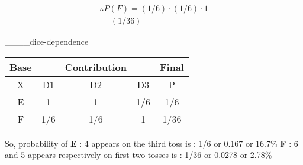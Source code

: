 \documentclass[journal,12pt,onecolumn]{IEEEtran}
\theoremstyle{remark}
\begin{document}
\begin{multicols}{2}
\begin{align}
\therefore     	P(F) = (1/6) \cdot (1/6) \cdot 1 \\= (1/36)
\end{align}
%
\begin{center}
\_\_\_\_dice-dependence
\newline
\begin{tabular}
{|c | c c c | c |}\hline
Base & &Contribution && Final\\\hline\hline
X & D1 & D2 & D3 & P \\[0.5ex]\hline
E & 1 & 1 & 1/6 & 1/6 \\[0.5ex]\hline
F & 1/6 & 1/6 & 1 & 1/36\\[0.5ex]\hline
\end{tabular}
\end{center}
%
So, probability of 
\newline
\textbf{E} : 4 appears on the third toss  is : 1/6 or 0.167 or 16.7\%
\medskip
\newline
\textbf{F} : 6 and 5 appears respectively on first two tosses is : 1/36 or 0.0278 or 2.78\%  
\end{multicols}
\end{document}
